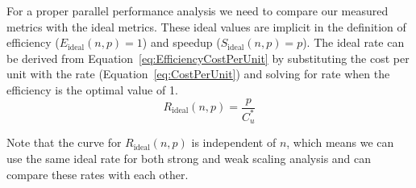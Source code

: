 \documentclass{llncs}
\begin{document}
For a proper parallel performance analysis we need to compare our measured
metrics with the ideal metrics. These ideal values are implicit in the
definition of efficiency ($E_\mathrm{ideal}(n,p) = 1$) and speedup
($S_\mathrm{ideal}(n,p) = p$).
The ideal rate can be derived from Equation~\ref{eq:EfficiencyCostPerUnit}
by substituting the cost per unit with the rate
(Equation~\ref{eq:CostPerUnit}) and solving for rate when the efficiency is
the optimal value of 1.
\begin{equation}
  R_\mathrm{ideal}(n,p) = \frac{p}{C_u^*}
  \label{eq:IdealRate}
\end{equation}

Note that the curve for $R_\mathrm{ideal}(n,p)$ is independent of $n$,
which means we can use the same ideal rate for both strong and weak scaling
analysis and can compare these rates with each other.


\end{document}
